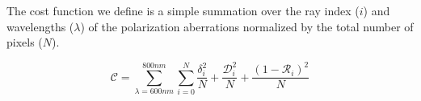 The cost function we define is a simple summation over the ray index ($i$) and wavelengths ($\lambda$) of the polarization aberrations normalized by the total number of pixels ($N$). 

\begin{equation}
    \mathcal{C} = \sum_{\lambda = 600nm}^{800nm} \sum_{i=0}^{N} \frac{\delta_{i}^{2}}{N} + \frac{\mathcal{D}_{i}^{2}}{N} + \frac{(1-\mathcal{R}_{i})^{2}}{N}
\end{equation}





